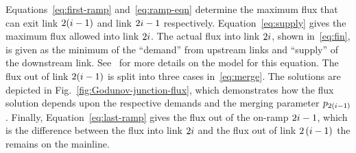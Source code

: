 Equations~\eqref{eq:first-ramp}
and~\eqref{eq:ramp-eqn} determine the maximum flux that can exit
link $2(i-1)$ and link $2i-1$ respectively. Equation~\eqref{eq:supply}
gives the maximum flux allowed into link $2i$. The actual flux
into link $2i$, shown in~\eqref{eq:fin}, is given as the minimum
of the ``demand'' from upstream links and ``supply'' of the downstream
link. See~\cite{Monache2014PdeOde} for more details on the model for this
equation. The flux out of link $2(i-1)$ is split into three cases
in~\eqref{eq:merge}. The solutions are depicted in Fig.~\ref{fig:Godunov-junction-flux},
which demonstrates how the flux solution depends upon the respective
demands and the merging parameter $p_{2\left(i-1\right)}$. Finally,
Equation~\eqref{eq:last-ramp} gives the flux out of the on-ramp $2i-1$,
which is the difference between the flux into link $2i$ and the
flux out of link $2\left(i-1\right)$ the remains on the mainline.
